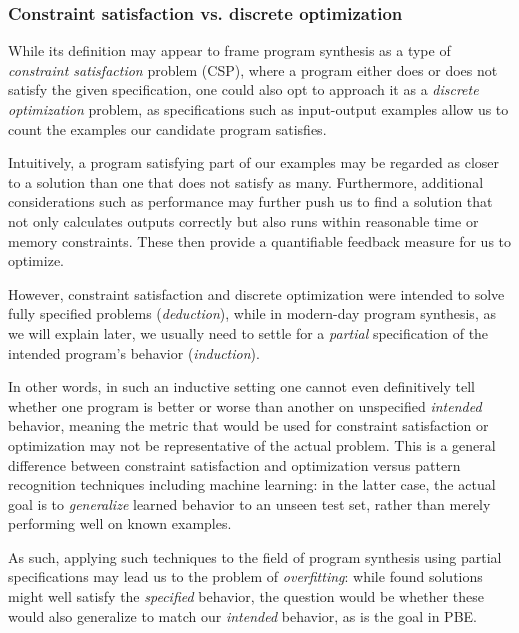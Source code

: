 \documentclass{article}
\begin{document}
\subsubsection{Constraint satisfaction vs. discrete optimization}

While its definition may appear to frame program synthesis as a type of \emph{constraint satisfaction} problem (CSP),
where a program either does or does not satisfy the given specification,
one could also opt to approach it as a \emph{discrete optimization} problem,
as specifications such as input-output examples allow us to count the examples our candidate program satisfies.

Intuitively, a program satisfying part of our examples may be regarded as closer to a solution than one that does not satisfy as many.
Furthermore, additional considerations such as performance may further push us to find a solution that not only calculates outputs correctly but also runs within reasonable time or memory constraints.
These then provide a quantifiable feedback measure for us to optimize.

However, constraint satisfaction and discrete optimization were intended to solve fully specified problems (\emph{deduction}),
while in modern-day program synthesis, as we will explain later,
we usually need to settle for a \emph{partial} specification of the intended program's behavior (\emph{induction}).

In other words, in such an inductive setting one cannot even definitively tell whether one program is better or worse than another on unspecified \emph{intended} behavior,
meaning the metric that would be used for constraint satisfaction or optimization may not be representative of the actual problem.
This is a general difference between constraint satisfaction and optimization versus pattern recognition techniques including machine learning:
in the latter case, the actual goal is to \emph{generalize} learned behavior to an unseen test set,
rather than merely performing well on known examples.

As such, applying such techniques to the field of program synthesis using partial specifications may lead us to the problem of \emph{overfitting}:
while found solutions might well satisfy the \emph{specified} behavior,
the question would be whether these would also generalize to match our \emph{intended} behavior,
as is the goal in PBE.
\end{document}
